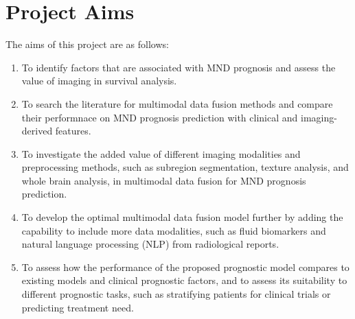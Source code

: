 
\section{Project Aims}

The aims of this project are as follows:

\begin{enumerate}[label=Aim \arabic*:]
    \item To identify factors that are associated with MND prognosis and assess the value of imaging in survival analysis.
    \item To search the literature for multimodal data fusion methods and compare their performnace on MND prognosis prediction with clinical and imaging-derived features.
    \item To investigate the added value of different imaging modalities and preprocessing methods, such as subregion segmentation, texture analysis, and whole brain analysis, in multimodal data fusion for MND prognosis prediction.
    \item To develop the optimal multimodal data fusion model further by adding the capability to include more data modalities, such as fluid biomarkers and natural language processing (NLP) from radiological reports.
    \item To assess how the performance of the proposed prognostic model compares to existing models and clinical prognostic factors, and to assess its suitability to different prognostic tasks, such as stratifying patients for clinical trials or predicting treatment need.
\end{enumerate}



